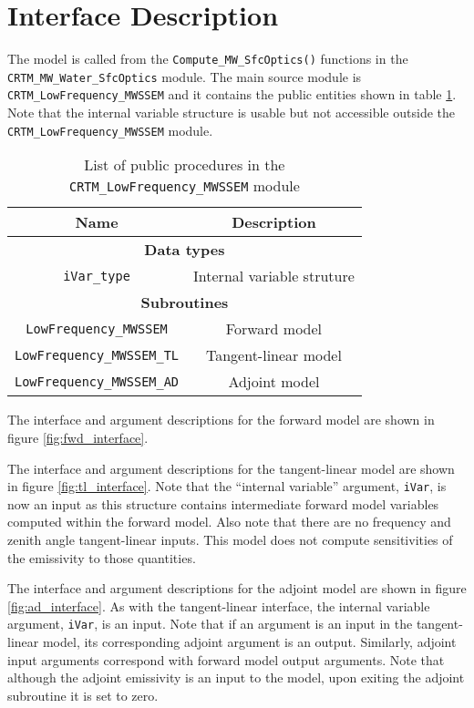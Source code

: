 \section{Interface Description}
The model is called from the \texttt{Compute\_MW\_SfcOptics()} functions in the \texttt{CRTM\_MW\_Water\_SfcOptics} module. The main source module is \texttt{CRTM\_LowFrequency\_MWSSEM} and it contains the public entities shown in table \ref{tab:main_procedures_list}. Note that the internal variable structure is usable but not accessible outside the \texttt{CRTM\_LowFrequency\_MWSSEM} module.
\begin{table}[htp]
  \centering
  \begin{tabular}{|c|c|}
    \hline
    \textbf{Name} & \textbf{Description} \\
    \hline\hline
    \multicolumn{2}{|c|}{\textbf{Data types}}\\
    \hline
    \texttt{iVar\_type}               & Internal variable struture \\
    \hline
    \multicolumn{2}{|c|}{\textbf{Subroutines}}\\
    \hline
    \texttt{LowFrequency\_MWSSEM}     & Forward model \\
    \texttt{LowFrequency\_MWSSEM\_TL} & Tangent-linear model \\
    \texttt{LowFrequency\_MWSSEM\_AD} & Adjoint model \\
    \hline
  \end{tabular}
  \caption{List of public procedures in the \texttt{CRTM\_LowFrequency\_MWSSEM} module}
  \label{tab:main_procedures_list}
\end{table}

The interface and argument descriptions for the forward model are shown in figure \ref{fig:fwd_interface}.

The interface and argument descriptions for the tangent-linear model are shown in figure \ref{fig:tl_interface}. Note that the ``internal variable'' argument, \texttt{iVar}, is now an input as this structure contains intermediate forward model variables computed within the forward model. Also note that there are no frequency and zenith angle tangent-linear inputs. This model does not compute sensitivities of the emissivity to those quantities.

The interface and argument descriptions for the adjoint model are shown in figure \ref{fig:ad_interface}. As with the tangent-linear interface, the internal variable argument, \texttt{iVar}, is an input. Note that if an argument is an input in the tangent-linear model, its corresponding adjoint argument is an output. Similarly, adjoint input arguments correspond with forward model output arguments. Note that although the adjoint emissivity is an input to the model, upon exiting the adjoint subroutine it is set to zero.


